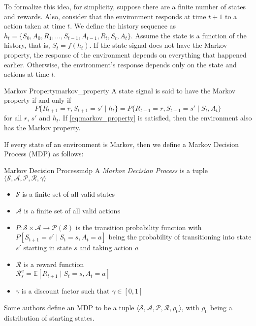 To formalize this idea, for simplicity, suppose there are a finite number of states and rewards. Also, consider that the environment responds at time $t+1$ to a action taken at time $t$. We define the history sequence as $h_t = \{S_0, A_0, R_1, \dots, S_{t-1}, A_{t-1}, R_t, S_t, A_t\}$. Assume the state is a function of the history, that is, $S_t = f(h_t)$. If the state signal does not have the Markov property, the response of the environment depends on everything that happened earlier. Otherwise, the environment's response depends only on the state and actions at time $t$.
\begin{definition}{Markov Property}{markov_property}
      A state signal is said to have the Markov property if and only if
      \begin{equation}\label{eq:markov_property}
            P\{R_{t+1} = r, S_{t+1} = s' \mid h_t\} = P\{R_{t+1} = r, S_{t+1} = s' \mid S_t, A_t\}
      \end{equation}
      for all $r$, $s'$ and $h_t$. If \ref{eq:markov_property} is satisfied, then the environment also has the Markov property.   
\end{definition}
If every state of an environment is Markov, then we define a Markov Decision Process (MDP) as follows:
\begin{definition}{Markov Decision Process}{mdp}
      A \textit{Markov Decision Process} is a tuple $\langle \mathcal{S}, \mathcal{A}, \mathcal{P}, \mathcal{R}, \gamma \rangle$
      \begin{itemize}
            \item $\mathcal{S}$ is a finite set of all valid states
            \item $\mathcal{A}$ is a finite set of all valid actions
            \item $P \colon \mathcal{S} \times \mathcal{A} \to \mathcal{P}(\mathcal{S})$ is the transition probability function with $P[S_{t+1} = s' \mid S_t = s, A_t = a]$ being the probability of transitioning into state $s'$ starting in state $s$ and taking action $a$
            \item $\mathcal{R}$ is a reward function\\$\mathcal{R}^a_s = \mathbb{E}[R_{t+1} \mid S_t = s, A_t = a]$
            \item $\gamma$ is a discount factor such that $\gamma \in [0, 1]$
      \end{itemize}  
\end{definition}
Some authors define an MDP to be a tuple $\langle \mathcal{S}, \mathcal{A}, \mathcal{P}, \mathcal{R}, \rho_0 \rangle$, with $\rho_0$ being a distribution of starting states.

